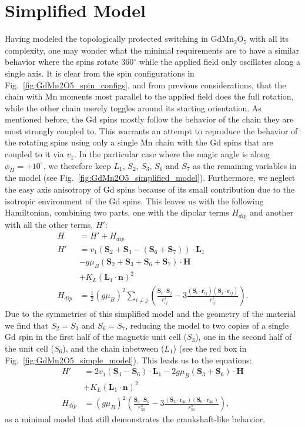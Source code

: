 \section{Simplified Model}
Having modeled the topologically protected switching in  GdMn$_2$O$_5$ with all its complexity, one may wonder what the minimal requirements are to have a similar behavior where the spins rotate 360$^\circ$ while the applied field only oscillates along a single axis.
It is clear from the spin configurations in Fig.~\ref{fig:GdMn2O5_spin_configs}, and from previous considerations, that the chain with Mn moments most parallel to the applied field does the full rotation, while the other chain merely toggles around its starting orientation. As mentioned before, the Gd spins mostly follow the behavior of the chain they are most strongly coupled to. This warrants an attempt to reproduce the behavior of the rotating spins using only a single Mn chain with the Gd spins that are coupled to it via $v_1$. 
In the particular case where the magic angle is along $\phi_H = +10^\circ$, we therefore keep $L_1$, $S_2$, $S_3$, $S_6$ and $S_7$ as the remaining variables in the model (see Fig.~\ref{fig:GdMn2O5_simplified_model}).
Furthermore, we neglect the easy axis anisotropy of Gd spins because of its small contribution due to the isotropic environment of the Gd spins.
This leaves us with the following Hamiltonian, combining two parts, one with the dipolar terms $H_{dip}$ and another with all the other terms, $H'$:
\begin{align}
	\label{eq:GdMn2O5_simple_model}
	H &= H' + H_{dip} \\
	H' &= v_1(\bm{S}_2 + \bm{S}_3 - (\bm{S}_6 + \bm{S}_7))\cdot\bm{L}_1 \nonumber\\
	&- g \mu_B (\bm{S}_2 + \bm{S}_3 + \bm{S}_6 + \bm{S}_7) \cdot \bm{H} \nonumber\\
	&+ K_L (\bm{L}_1 \cdot \bm{n})^2 \nonumber\\
	H_{dip} &= \frac{1}{2}(g \mu_B)^2\sum_{i\neq j}\left(\frac{\bm{S}_i\cdot \bm{S}_j}{r_{ij}^
3}-3\frac{(\bm{S}_i\cdot \bm{r}_{ij})(\bm{S}_j\cdot \bm{r}_{ij})}{r_{ij}^5}\right)\nonumber.
\end{align}
Due to the symmetries of this simplified model and the geometry of the material we find that $S_2 = S_3$ and $S_6 = S_7$, reducing the model to two copies of a single Gd spin in the first half of the magnetic unit cell ($S_3$), one in the second half of the unit cell ($S_6$), and the chain inbetween ($L_1$) (see the red box in Fig.~\ref{fig:GdMn2O5_simple_model}).
This leads us to the equations:
\begin{align}
	H' &= 2v_1(\bm{S}_3 - \bm{S}_6)\cdot\bm{L}_1 - 2g \mu_B (\bm{S}_3 + \bm{S}_6) 
\cdot \bm{H} \\
	&+ K_L (\bm{L}_1 \cdot \bm{n})^2 \nonumber\\
	H_{dip} &= (g \mu_B)^2\left(\frac{\bm{S}_3\cdot \bm{S}_6}{r_{36}^3}-3\frac{(\bm{S}_3\cdot \bm{r}_{36})(\bm{S}_6\cdot \bm{r}_{36})}{r_{36}^5}\right)\nonumber,
\end{align}
as a minimal model that still demonstrates the crankshaft-like behavior.

